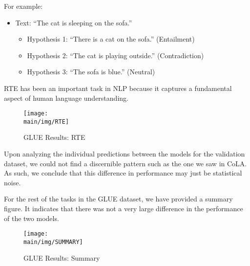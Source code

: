 \documentclass[\main/thesis.tex]{subfiles}
\begin{document}
For example:
\begin{itemize}
    \item Text: ``The cat is sleeping on the sofa.''
    \begin{itemize}
        \item Hypothesis 1: ``There is a cat on the sofa.'' (Entailment)
        \item Hypothesis 2: ``The cat is playing outside.'' (Contradiction)
        \item Hypothesis 3: ``The sofa is blue.'' (Neutral)
    \end{itemize}
\end{itemize}

RTE has been an important task in NLP because it captures a fundamental aspect of human language understanding. 

\begin{figure}
    \texttt{[image: \\main/img/RTE]}
    \caption[GLUE Results: RTE] {GLUE Results: RTE}
    \label{fig:rte_fig}
\end{figure}

Upon analyzing the individual predictions between the models for the validation dataset,
we could not find a discernible pattern such as the one we saw in CoLA.
As such, we conclude that this difference in performance may just be statistical noise. 

For the rest of the tasks in the GLUE dataset, we have provided a summary figure. It indicates 
that there was not a very large difference in the performance of the two models. 

\begin{figure}
    \texttt{[image: \\main/img/SUMMARY]}
    \caption[GLUE Results: Summary] {GLUE Results: Summary}
    \label{fig:rte_fig}
\end{figure}
\end{document}
